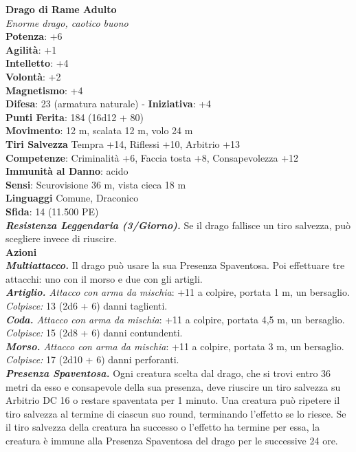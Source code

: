 \begin{multicols}{2}
\medskip\textbf{Drago di Rame Adulto}\\
\emph{Enorme drago, caotico buono}\\
\textbf{Potenza}: +6\\
\textbf{Agilità}: +1\\
\textbf{Intelletto}: +4\\
\textbf{Volontà}: +2\\
\textbf{Magnetismo}: +4\\
\textbf{Difesa}: 23 (armatura naturale) - \textbf{Iniziativa}: +4\\
\textbf{Punti Ferita}: 184 (16d12 + 80)\\
\textbf{Movimento}: 12 m, scalata 12 m, volo 24 m\\
\textbf{Tiri Salvezza} Tempra +14, Riflessi +10, Arbitrio +13\\
\textbf{Competenze}: Criminalità +6, Faccia tosta +8, Consapevolezza +12\\
\textbf{Immunità al Danno}: acido\\
\textbf{Sensi}: Scurovisione 36 m, vista cieca 18 m\\
\textbf{Linguaggi} Comune, Draconico\\
\textbf{Sfida}: 14 (11.500 PE)\smallskip\\
\emph{\textbf{Resistenza Leggendaria (3/Giorno).}} Se il drago fallisce un tiro salvezza, può scegliere invece di riuscire.\\
\smallskip\textbf{Azioni} \\
\emph{\textbf{Multiattacco.}} Il drago può usare la sua Presenza Spaventosa. Poi effettuare tre attacchi: uno con il morso e due con gli artigli.\\
\emph{\textbf{Artiglio.} Attacco con arma da mischia}: +11 a colpire, portata 1 m, un bersaglio.\\
\emph{Colpisce:} 13 (2d6 + 6) danni taglienti.\\
\emph{\textbf{Coda.} Attacco con arma da mischia}: +11 a colpire, portata 4,5 m, un bersaglio.\\
\emph{Colpisce:} 15 (2d8 + 6) danni contundenti.\\
\emph{\textbf{Morso.} Attacco con arma da mischia}: +11 a colpire, portata 3 m, un bersaglio.\\
\emph{Colpisce:} 17 (2d10 + 6) danni perforanti.\\
\emph{\textbf{Presenza Spaventosa.}} Ogni creatura scelta dal drago, che si trovi entro 36 metri da esso e consapevole della sua presenza, deve riuscire un tiro salvezza su Arbitrio DC 16 o restare spaventata per 1 minuto. Una creatura può ripetere il tiro salvezza al termine di ciascun suo round, terminando l'effetto se lo riesce. Se il tiro salvezza della creatura ha successo o l'effetto ha termine per essa, la creatura è immune alla Presenza Spaventosa del drago per le successive 24 ore. \\

\end{multicols}
